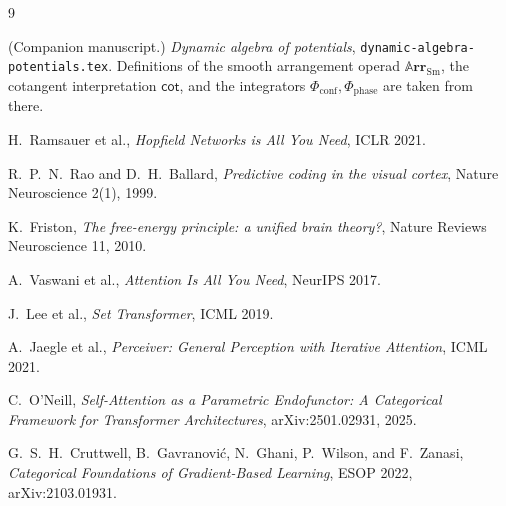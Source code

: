 \documentclass[11pt]{article}
\theoremstyle{plain}
\theoremstyle{definition}
\theoremstyle{remark}
\newcommand{\Cat}[1]{\mathbf{#1}}
\newcommand{\Sm}{\mathrm{Sm}}
\newcommand{\arr}{\mathbb{A}\Cat{rr}}    %
\newcommand{\sarr}{\arr_{\Sm}}           %
\renewcommand{\cot}{\mathsf{cot}}        %
\newcommand{\conf}{\mathrm{conf}}
\newcommand{\phase}{\mathrm{phase}}
\newcommand{\Phiconf}{\Phi_{\conf}}
\newcommand{\Phiphase}{\Phi_{\phase}}
\begin{document}
\begin{thebibliography}{9}

 (Companion manuscript.) \emph{Dynamic algebra of potentials},
\texttt{dynamic-algebra-potentials.tex}. Definitions of the smooth
arrangement operad $\sarr$, the cotangent interpretation $\cot$, and the
integrators $\Phiconf,\Phiphase$ are taken from there.

 H.~Ramsauer et al.,
\emph{Hopfield Networks is All You Need}, ICLR 2021.

 R.~P.~N.~Rao and D.~H.~Ballard,
\emph{Predictive coding in the visual cortex}, Nature Neuroscience 2(1), 1999.

 K.~Friston,
\emph{The free-energy principle: a unified brain theory?},
Nature Reviews Neuroscience 11, 2010.

 A.~Vaswani et al.,
\emph{Attention Is All You Need}, NeurIPS 2017.

 J.~Lee et al.,
\emph{Set Transformer}, ICML 2019.

 A.~Jaegle et al.,
\emph{Perceiver: General Perception with Iterative Attention}, ICML 2021.

 C.~O'Neill,
\emph{Self-Attention as a Parametric Endofunctor: A Categorical Framework for
Transformer Architectures}, arXiv:2501.02931, 2025.

 G.~S.~H.~Cruttwell, B.~Gavranovi\'{c}, N.~Ghani, P.~Wilson,
and F.~Zanasi, \emph{Categorical Foundations of Gradient-Based Learning},
ESOP 2022, arXiv:2103.01931.

\end{thebibliography}
\end{document}
